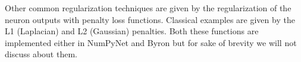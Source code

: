 \documentclass{standalone}
\begin{document}
Other common regularization techniques are given by the regularization of the neuron outputs with penalty loss functions.
Classical examples are given by the L1 (Laplacian) and L2 (Gaussian) penalties.
Both these functions are implemented either in NumPyNet and Byron but for sake of brevity we will not discuss about them.
\end{document}
